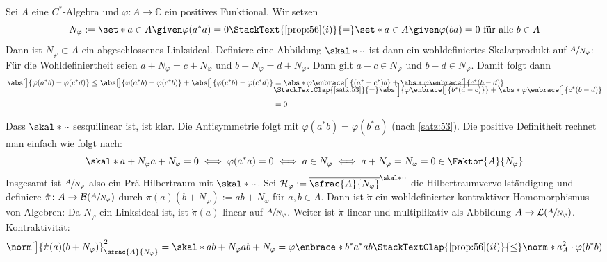 \begin{satzUnshaded}[{name={GNS-Konstruktion}},label=gns]
	Sei $A$ eine $C^*$-Algebra und $\varphi \colon A \to \mathbb{C}$ ein positives Funktional. 
	Wir setzen 
	\[
		N_\varphi := \set*{a \in A \given \varphi(a^*a)=0}\StackText{\ref{prop:56}(i)}{=}\set*{a \in A \given \varphi(ba)=0 \text{ für alle }b \in A}
	\]
	Dann ist $N_\varphi \subset A$ ein abgeschlossenes Linksideal. 
	Definiere eine Abbildung
	$\skal*{\cdot}{\cdot}$ ist dann ein wohldefiniertes Skalarprodukt auf $\sfrac{A}{N_\varphi}$:
	Für die Wohldefiniertheit seien $a+N_\varphi=c+N_\varphi$ und $b+N_\varphi=d+N_\varphi$.
	Dann gilt $a-c \in N_\varphi$ und $b-d \in N_\varphi$. Damit folgt dann
	\begin{align}
		\abs[\big]{\varphi(a^*b)-\varphi(c^*d)} \le \abs[\big]{\varphi(a^*b)-\varphi(c^*b)} + \abs[\big]{\varphi(c^*b)- \varphi(c^*d)} &= \abs*{\varphi \enbrace[\big]{(a^*-c^*)b}} + \abs*{\varphi \enbrace[\big]{c^*(b-d)}} \\[-1em]
		&\StackTextClap{\ref{satz:53}}{=} \abs[\Big]{\overline{\varphi \enbrace[\big]{b^*(a-c)}}} + \abs*{\varphi \enbrace[\big]{c^*(b-d)}}\\ &=0
	\end{align}
	Dass $\skal*{\cdot}{\cdot}$ sesquilinear ist, ist klar.
	Die Antisymmetrie folgt mit $\varphi(a^*b)=\overline{\varphi(b^*a)}$ (nach \autoref{satz:53}). 
	Die positive Definitheit rechnet man einfach wie folgt nach:
	\[
		\skal*{a+N_\varphi}{a+N_\varphi}= 0 \iff \varphi(a^*a)=0 \iff a \in N_\varphi \iff a+ N_\varphi = N_\varphi =0 \in \Faktor{A}{N_\varphi}
	\]
	Insgesamt ist $\sfrac{A}{N_\varphi}$ also ein Prä-Hilbertraum mit $\skal*{\cdot}{\cdot}$.
	Sei $\mathcal{H}_\varphi := \overline{\sfrac{A}{N_\varphi}}^{\skal*{\cdot}{\cdot}}$ die Hilbertraumvervollständigung und definiere $\dot{\pi} \colon A \to \mathcal{B}(\sfrac{A}{N_\varphi})$ durch $\dot{\pi}(a)(b+N_\varphi) := ab + N_\varphi$ für $a,b \in A$.
	Dann ist $\dot{\pi}$ ein wohldefinierter kontraktiver Homomorphismus von Algebren:
	Da $N_\varphi$ ein Linksideal ist, ist $\dot{\pi}(a)$ linear auf $\sfrac{A}{N_\varphi}$. Weiter ist $\dot{\pi}$ linear und multiplikativ als Abbildung $A \to \mathcal{L}(\sfrac{A}{N_\varphi})$. Kontraktivität:
	\begin{align}
		\norm[\big]{\dot{\pi}(a)(b+N_\varphi)}^2_{\sfrac{A}{N_\varphi}} = \skal*{ab+N_\varphi}{ab+N_\varphi} = \varphi \enbrace*{b^*a^*ab} &\StackTextClap{\ref{prop:56}(ii)}{\le} \norm*{a}_A^2 \cdot \varphi(b^*b) \\

\end{align}
\end{satzUnshaded}
